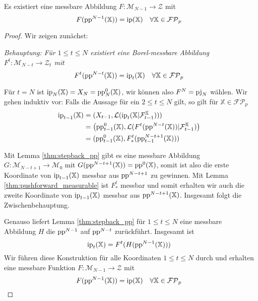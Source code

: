     \begin{lemma}\label{thm:ip_from_pp}
        Es existiert eine messbare Abbildung $F:\mathcal{M}_{N-1}\rightarrow \mathcal{Z}$ mit 
        $$F(\operatorname{pp}^{N-1}(\mathbb{X})) = \operatorname{ip}(\mathbb{X}) \quad \forall \mathbb{X} \in \mathcal{FP}_p$$
    \end{lemma}
    \begin{proof}
        Wir zeigen zunächst:

        \emph{Behauptung: Für $1\leq t \leq N$ existiert eine Borel-messbare Abbildung $F^t: \mathcal{M}_{N-t}\rightarrow \mathcal{Z}_t$ mit
        $$F^t(\operatorname{pp}^{N-t}(\mathbb{X})) = \operatorname{ip}_t(\mathbb{X}) \quad \forall \mathbb{X} \in \mathcal{FP}_p$$}

        Für $t=N$ ist $\operatorname{ip}_N(\mathbb{X}) = X_N = \operatorname{pp}_N^0(\mathbb{X})$, wir können also $F^N=\operatorname{pj}_N$ wählen. Wir gehen induktiv vor: Falls die Aussage für ein $2\leq t \leq N$ gilt, so gilt für $\mathbb{X} \in \mathcal{FP}_p$
        \begin{align*}
            \operatorname{ip}_{t-1}(\mathbb{X}) &= (X_{t-1}, \mathcal{L}(\operatorname{ip}_t(\mathbb{X} \vert \mathcal{F}_{t-1}^{\mathbb{X}}))) \\
            &= \left(\operatorname{pp}_{t-1}^0(\mathbb{X}), \mathcal{L}(F^t(\operatorname{pp}^{N-t}(\mathbb{X})) \vert \mathcal{F}_{t-1}^\mathbb{X})\right) \\
            &= (\operatorname{pp}_{t-1}^0(\mathbb{X}), F^t_*(\operatorname{pp}_{t-1}^{N-t+1}(\mathbb{X})))
        \end{align*}

        Mit Lemma \ref{thm:stepback_pp} gibt es eine messbare Abbildung $G: \mathcal{M}_{N-t+1}\rightarrow \mathcal{M}_0$ mit $G(\operatorname{pp}^{N-t+1}(\mathbb{X})) = \operatorname{pp}^{0}(\mathbb{X})$, somit ist also die erste Koordinate von $\operatorname{ip}_{t-1}(\mathbb{X})$ messbar aus $\operatorname{pp}^{N-t+1}$ zu gewinnen. Mit Lemma \ref{thm:pushforward_measurable} ist $F_*^t$ messbar und somit erhalten wir auch die zweite Koordinate von $\operatorname{ip}_{t-1}(\mathbb{X})$ messbar aus $\operatorname{pp}^{N-t+1}(\mathbb{X})$. Insgesamt folgt die Zwischenbehauptung. 

        Genauso liefert Lemma \ref{thm:stepback_pp} für $1\leq t \leq N$ eine messbare Abbildung $H$ die $\operatorname{pp}^{N-1}$ auf $\operatorname{pp}^{N-t}$ zurückführt. Insgesamt ist 
        $$\operatorname{ip}_t(\mathbb{X}) = F^t(H(\operatorname{pp}^{N-1}(\mathbb{X})))$$
        Wir führen diese Konstruktion für alle Koordinaten $1\leq t\leq N$ durch und erhalten eine messbare Funktion $F: \mathcal{M}_{N-1}\rightarrow \mathcal{Z}$ mit 
        $$F(\operatorname{pp}^{N-1}(\mathbb{X})) = \operatorname{ip}(\mathbb{X}) \quad \forall \mathbb{X} \in \mathcal{FP}_p$$
    \end{proof}
